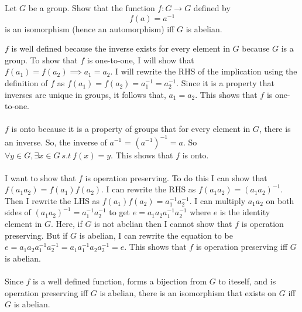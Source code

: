 \documentclass[titlepage]{article}
\begin{document}
\begin{problem}{4}
Let $G$ be a group. Show that the function $f: G \rightarrow G$ defined by
$$ f(a) = a^{-1}$$
is an isomorphism (hence an automorphism) iff $G$ is abelian.
\end{problem}
\begin{solution}
$f$ is well defined because the inverse exists for every element in $G$ because $G$ is a group.
To show that $f$ is one-to-one, I will show that $f(a_1) = f(a_2) \implies a_1 = a_2$. I will rewrite the RHS of the implication using the definition of $f$ as $f(a_1) = f(a_2) = a^{-1}_1 = a^{-1}_2$. Since it is a property that inverses are unique in groups, it follows that, $a_1 = a_2$. This shows that $f$ is one-to-one.
\\ \\
$f$ is onto because it is a property of groups that for every element in $G$, there is an inverse. So, the inverse of $a^{-1}$ = ${(a^{-1})}^{-1} = a$. So $\forall y \in G, \exists x \in G \ s.t \ f(x) = y$. This shows that $f$ is onto.
\\ \\
I want to show that $f$ is operation preserving. To do this I can show that $f(a_1 a_2) = f(a_1) f(a_2)$. I can rewrite the RHS as $f(a_1 a_2) = {(a_1a_2)}^{-1}.$ Then I rewrite the LHS as $f(a_1) f(a_2) = a_1^{-1} a_2^{-1}$. I can multiply $a_1a_2$ on both sides of ${(a_1a_2)}^{-1} = a_1^{-1} a_2^{-1}$ to get $e = a_1 a_2 a_1^{-1} a_2^{-1}$ where $e$ is the identity element in $G$. Here, if $G$ is not abelian then I cannot show that $f$ is operation preserving. But if $G$ is abelian, I can rewrite the equation to be $e = a_1 a_2 a_1^{-1} a_2^{-1} = a_1 a_1^{-1} a_2 a_2^{-1} = e$. This shows that $f$ is operation preserving iff $G$ is abelian.
\\ \\
Since $f$ is a well defined function, forms a bijection from $G$ to iteself, and is operation preserving iff $G$ is abelian, there is an isomorphism that exists on $G$ iff $G$ is abelian.
\end{solution}
\end{document}
